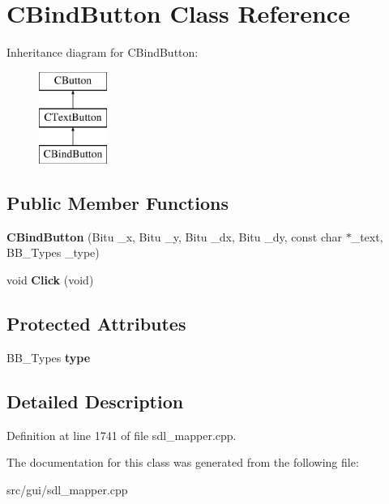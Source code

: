 \hypertarget{classCBindButton}{\section{C\-Bind\-Button Class Reference}
\label{classCBindButton}
}
Inheritance diagram for C\-Bind\-Button\-:\begin{figure}[H]
\begin{center}
\leavevmode
\includegraphics[height=3.000000cm]{classCBindButton}
\end{center}
\end{figure}
\subsection*{Public Member Functions}
\begin{DoxyCompactItemize}
\item 
\hypertarget{classCBindButton_ac88961b71a1666452f4d848f851259d9}{{\bfseries C\-Bind\-Button} (Bitu \-\_\-x, Bitu \-\_\-y, Bitu \-\_\-dx, Bitu \-\_\-dy, const char $\ast$\-\_\-text, B\-B\-\_\-\-Types \-\_\-type)}\label{classCBindButton_ac88961b71a1666452f4d848f851259d9}

\item 
\hypertarget{classCBindButton_a62e84c58b256b4b9f82d6ad1ca32be45}{void {\bfseries Click} (void)}\label{classCBindButton_a62e84c58b256b4b9f82d6ad1ca32be45}

\end{DoxyCompactItemize}
\subsection*{Protected Attributes}
\begin{DoxyCompactItemize}
\item 
\hypertarget{classCBindButton_a6d3fe3711c3f57f5e2ec7a2311408795}{B\-B\-\_\-\-Types {\bfseries type}}\label{classCBindButton_a6d3fe3711c3f57f5e2ec7a2311408795}

\end{DoxyCompactItemize}


\subsection{Detailed Description}


Definition at line 1741 of file sdl\-\_\-mapper.\-cpp.



The documentation for this class was generated from the following file\-:\begin{DoxyCompactItemize}
\item 
src/gui/sdl\-\_\-mapper.\-cpp\end{DoxyCompactItemize}
